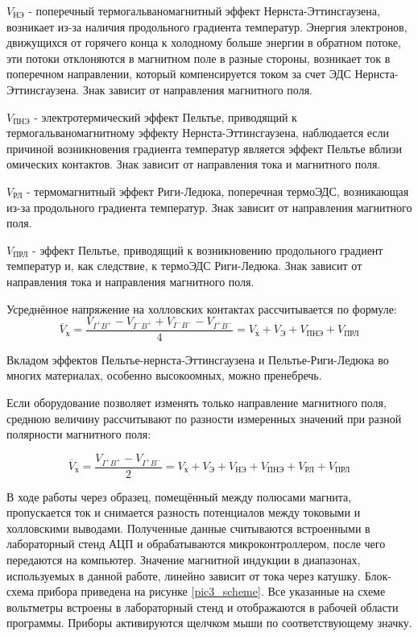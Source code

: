 $V_{\text{НЭ}}$ - поперечный термогальваномагнитный эффект Нернста-Эттинсгаузена, возникает из-за наличия продольного градиента температур. Энергия электронов, движущихся от горячего конца к холодному больше энергии в обратном потоке, эти потоки отклоняются в магнитном поле в разные стороны, возникает ток в поперечном направлении, который компенсируется током за счет ЭДС Нернста-Эттинсгаузена. Знак зависит от направления магнитного поля.

$V_{\text{ПНЭ}}$ - электротермический эффект Пельтье, приводящий к термогальваномагнитному эффекту Нернста-Эттинсгаузена, наблюдается если причиной возникновения градиента температур является эффект Пельтье вблизи омических контактов. Знак зависит от направления тока и магнитного поля.

$V_{\text{РЛ}}$ - термомагнитный эффект Риги-Ледюка, поперечная термоЭДС, возникающая из-за продольного градиента температур. Знак зависит от направления магнитного поля.

$V_{\text{ПРЛ}}$ - эффект Пельтье, приводящий к возникновению продольного градиент температур и, как следствие, к термоЭДС Риги-Ледюка. Знак зависит от направления тока и направления магнитного поля.

Усреднённое напряжение на холловских контактах рассчитывается по формуле:
\begin{equation}
\overline{V}_{\text{х}} = \frac{V_{I^{+}B^{+}} - V_{I^{-}B^{+}} + V_{I^{-}B^{-}} - V_{I^{+}B^{-}}}{4} = V_{\text{х}} + V_{\text{Э}} + V_{\text{ПНЭ}} + V_{\text{ПРЛ}}
\end{equation}

Вкладом эффектов Пельтье-нернста-Эттинсгаузена и Пельтье-Риги-Ледюка во многих материалах, особенно высокоомных, можно пренебречь.

Если оборудование позволяет изменять только направление магнитного поля, среднюю величину рассчитывают по разности измеренных значений при разной полярности магнитного поля:

\begin{equation}
\overline{V}_{\text{х}} = \frac{V_{I^{+}B^{+}} - V_{I^{+}B^{-}}}{2} = V_{\text{х}} + V_{\text{Э}} + V_{\text{НЭ}} + V_{\text{ПНЭ}} + V_{\text{РЛ}} + V_{\text{ПРЛ}}
\end{equation}

В ходе работы через образец, помещённый между полюсами магнита, пропускается ток и снимается разность потенциалов между токовыми и холловскими выводами. Полученные данные считываются встроенными в лабораторный стенд АЦП и обрабатываются микроконтроллером, после чего передаются на компьютер. Значение магнитной индукции в диапазонах, используемых в данной работе, линейно зависит от тока через катушку. Блок-схема прибора приведена на рисунке \ref{pic3_scheme}. Все указанные на схеме вольтметры встроены в лабораторный стенд и отображаются в рабочей области программы. Приборы активируются щелчком мыши по соответствующему значку.

